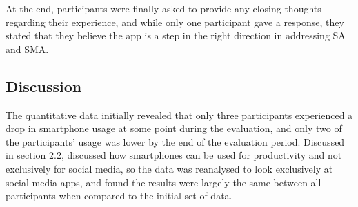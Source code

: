 \documentclass[12pt]{article}
\begin{document}




At the end, participants were finally asked to provide any closing thoughts regarding their experience, and while only one participant gave a response, they stated that they believe the 
app is a step in the right direction in addressing SA and SMA.


\subsection{Discussion}

The quantitative data initially revealed that only three participants experienced a drop in smartphone usage at some point during the evaluation, and only two 
of the participants' usage was lower by the end of the evaluation period. Discussed in section 2.2, \textcite{RefWorks:RefID:35-dosselaar2017smartphone} discussed how smartphones can be used 
for productivity and not exclusively for social media, so the data was reanalysed to look exclusively at social media apps, and found the results were largely the same between all participants when compared to
the initial set of data.\newline
\end{document}
